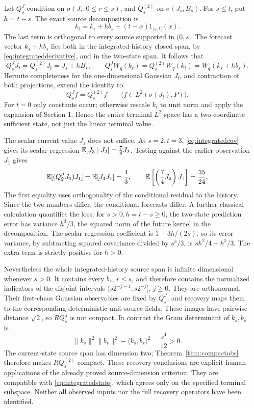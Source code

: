 \documentclass[11pt]{article}
\begin{document}
Let $Q_s^J$ condition on $\sigma(J_r:0\leq r\leq s)$, and
$Q_s^{(2)}$ on $\sigma(J_s,B_s)$. For $s\leq t$, put $h=t-s$.
The exact source decomposition is
\[
 k_t=k_s+h b_s+(t-x)1_{(s,t]}(x).
\]
The last term is orthogonal to every source supported in $(0,s]$.
The forecast vector $k_s+h b_s$ lies both in the integrated-history
closed span, by \eqref{eq:integratedderivative}, and in the two-state
span. It follows that
\begin{equation}\label{eq:integratedforecast}
 Q_s^J J_t=Q_s^{(2)}J_t=J_s+hB_s,\qquad
 Q_s^J W_q(k_t)=Q_s^{(2)}W_q(k_t)=W_q(k_s+h b_s).
\end{equation}
Hermite completeness for the one-dimensional Gaussian $J_t$, and
contraction of both projections, extend the identity to
\begin{equation}\label{eq:integratedstate}
 Q_s^J f=Q_s^{(2)}f\qquad
       \bigl(f\in L^2(\sigma(J_t),P)\bigr).
\end{equation}
For $t=0$ only constants occur; otherwise rescale $k_t$ to unit norm
and apply the expansion of Section 1. Hence the entire terminal
$L^2$ space has a two-coordinate sufficient state, not just the
linear terminal value.

The scalar current value $J_s$ does not suffice. At $s=2,t=3$,
\eqref{eq:integratedcov} gives its scalar regression
$\mathbb E[J_3\mid J_2]=\tfrac74J_2$. Testing against the earlier
observation $J_1$ gives
\[
 \mathbb E[(Q_2^J J_3)J_1]=\mathbb E[J_3J_1]=\frac43,\qquad
 \mathbb E\left[\left(\frac74J_2\right)J_1\right]=\frac{35}{24}.
\]
The first equality uses orthogonality of the conditional residual to
the history. Since the two numbers differ, the conditional forecasts
differ. A further classical calculation quantifies the loss: for
$s>0,h=t-s\geq0$, the two-state prediction error has variance
$h^3/3$, the squared norm of the future kernel in the decomposition.
The scalar regression coefficient is $1+3h/(2s)$, so its error
variance, by subtracting squared covariance divided by $s^3/3$,
is $sh^2/4+h^3/3$. The extra term is strictly positive for $h>0$.

Nevertheless the whole integrated-history source span is infinite
dimensional whenever $s>0$. It contains every $b_r$, $r\leq s$,
and therefore contains the normalized indicators of the disjoint
intervals $(s2^{-j-1},s2^{-j}]$, $j\geq0$. They are orthonormal.
Their first-chaos Gaussian observables are fixed by $Q_s^J$, and
recovery maps them to the corresponding deterministic unit source
fields. These images have pairwise distance $\sqrt2$, so $RQ_s^J$
is not compact. In contrast the Gram determinant of $k_s,b_s$ is
\[
 \|k_s\|^2\|b_s\|^2-\langle k_s,b_s\rangle^2
            =\frac{s^4}{12}>0.
\]
The current-state source span has dimension two; Theorem~\ref{thm:compactobs} therefore
makes $RQ_s^{(2)}$ compact. These recovery conclusions are explicit
human applications of the already proved source-dimension criterion.
They are compatible with \eqref{eq:integratedstate}, which agrees
only on the specified terminal subspace. Neither all observed inputs
nor the full recovery operators have been identified.
\end{document}
